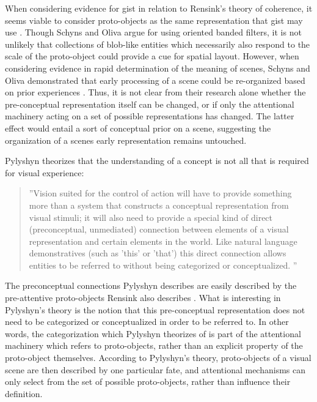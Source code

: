 When considering evidence for gist in relation to Rensink's theory of coherence, it seems viable to consider proto-objects as the same representation that gist may use \cite{Rensink2002}.  Though Schyns and Oliva argue for using oriented banded filters, it is not unlikely that collections of blob-like entities which necessarily also respond to the scale of the proto-object could provide a cue for spatial layout.   However, when considering evidence in rapid determination of the meaning of scenes, Schyns and Oliva demonstrated that early processing of a scene could be re-organized based on prior experiences \cite{Schyns1994,Oliva1997}.  Thus, it is not clear from their research alone whether the pre-conceptual representation itself can be changed, or if only the attentional machinery acting on a set of possible representations has changed.  The latter effect would entail a sort of conceptual prior on a scene, suggesting the organization of a scenes early representation remains untouched.

Pylyshyn theorizes that the understanding of a concept is not all that is required for visual experience: 
\begin{quotation}
''Vision suited for the control of action will have to provide something more than a system that constructs a conceptual representation from visual stimuli; it will also need to provide a special kind of direct (preconceptual, unmediated) connection between elements of a visual representation and certain elements in the world. Like natural language demonstratives (such as 'this' or 'that') this direct connection allows entities to be referred to without being categorized or conceptualized. \cite{Pylyshyn2001}''
\end{quotation}  
The preconceptual connections Pylyshyn describes are easily described by the pre-attentive proto-objects Rensink also describes \cite{Rensink2000,Rensink2001}.  What is interesting in Pylyshyn's theory is the notion that this pre-conceptual representation does not need to be categorized or conceptualized in order to be referred to.  In other words, the categorization which Pylyshyn theorizes of is part of the attentional machinery which refers to proto-objects, rather than an explicit property of the proto-object themselves.  According to Pylyshyn's theory, proto-objects of a visual scene are then described by one particular fate, and attentional mechanisms can only select from the set of possible proto-objects, rather than influence their definition. 


